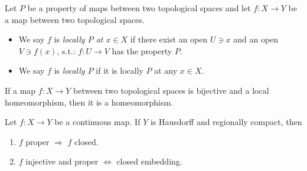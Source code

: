 \begin{definition}
    Let $P$ be a property of maps between two topological spaces and let $f : X \to Y$ be a map between two topological spaces.
    \begin{itemize}
        \item We say $f$ is \textit{locally $P$ at $x \in X$} if there exist an open $U \ni x$ and an open $V \ni f(x)$, s.t.: $f: U \to V$ has the property $P$.
        \item We say $f$ is \textit{locally $P$} if it is locally $P$ at any $x \in X$.
    \end{itemize}
\end{definition}

\begin{proposition}
    If a map $f: X \to Y$ between two topological spaces is bijective and a local homeomorphism, then it is a homeomorphism.
\end{proposition}

\begin{proposition}
    Let $f: X \to Y$ be a continuous map. If $Y$ is Hausdorff and regionally compact, then
    \begin{enumerate}
        \item $f$ proper $\Rightarrow$ $f$ closed.
        \item $f$ injective and proper $\Leftrightarrow$ closed embedding.
    \end{enumerate}
\end{proposition}

